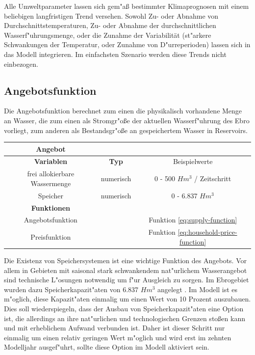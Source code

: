 \documentclass[11pt,a4paper]{article}
\begin{document}
Alle Umweltparameter lassen sich gem"aß bestimmter Klimaprognosen mit einem beliebigen langfristigen Trend versehen. Sowohl Zu- oder Abnahme von Durchschnittstemperaturen, Zu- oder Abnahme der durchschnittlichen Wasserf"uhrungsmenge, oder die Zunahme der Variabilität (st"arkere Schwankungen der Temperatur, oder Zunahme von D"urreperioden) lassen sich in das Modell integrieren. Im einfachsten Szenario werden diese Trends nicht einbezogen. \\


\subsection{Angebotsfunktion}\label{sec:Angebotsfunktion}

Die Angebotsfunktion berechnet zum einen die physikalisch vorhandene Menge an Wasser, die zum einen als Stromgr"oße der aktuellen Wasserf"uhrung des Ebro vorliegt, zum anderen als Bestandsgr"oße an gespeichertem Wasser in Reservoirs.


\begin{tabular}{|c|c|c|}
\hline \textbf{Angebot} & & \\ 
\hline \textbf{Variablen} & \textbf{Typ} & Beispielwerte\\ 
\hline frei allokierbare Wassermenge & numerisch & 0 - 500 $Hm^3$ / Zeitschritt \\ 
\hline Speicher & numerisch & 0 - 6.837 $Hm^3$ \\ 
\hline \textbf{Funktionen} & & \\ 
\hline Angebotsfunktion & & Funktion \ref{eq:supply-function} \\
\hline Preisfunktion & & Funktion \ref{eq:household-price-function}\\
\hline 
\end{tabular} 


Die Existenz von Speichersystemen ist eine wichtige Funktion des Angebots. Vor allem in Gebieten mit saisonal stark schwankendem nat"urlichem Wasserangebot sind technische L"osungen notwendig um f"ur Ausgleich zu sorgen. Im Ebrogebiet wurden dazu Speicherkapazit"aten von 6.837 $Hm^3$ angelegt \citep{Penagos2007}. Im Modell ist es m"oglich, diese Kapazit"aten einmalig um einen Wert von 10 Prozent auszubauen. Dies soll wiederspiegeln, dass der Ausbau von Speicherkapazit"aten eine Option ist, die allerdings an ihre nat"urlichen und technologischen Grenzen stoßen kann und mit erheblichem Aufwand verbunden ist. Daher ist dieser Schritt nur einmalig um einen relativ geringen Wert m"oglich und wird erst im zehnten Modelljahr ausgef"uhrt, sollte diese Option im Modell aktiviert sein.
\end{document}
